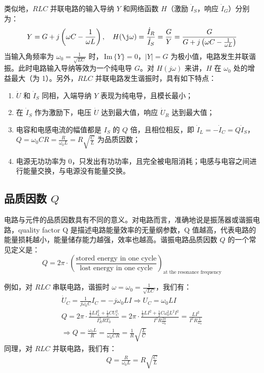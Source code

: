 \documentclass[UTF8]{report}
\def\Im{\,\mathrm{Im}\,}
\theoremstyle{MyLineTheoremStyle} %
\theoremstyle{MyBlockTheoremStyle} %
\theoremstyle{MySubsubsectionStyle} %
\begin{document}
类似地，$RLC$ 并联电路的输入导纳 $Y$ 和网络函数 $H$（激励 $\dot{I}_S$，响应 $\dot{I}_{G}$）分别为：
\begin{equation}
Y = G + j \left(\omega C - \frac{1}{\omega L}\right),\quad
H(\j\omega) = \frac{\dot{I}_R}{\dot{I}_S} = \frac{G}{Y} = \frac{G}{G + j \left(\omega C - \frac{1}{\omega L}\right)}
\end{equation}
当输入角频率为 $\omega_0 = \frac{1}{\sqrt{LC}}$ 时，$\Im \{Y\} = 0$，$|Y| = G$ 为极小值，电路发生并联谐振。此时电路输入导纳等效为一个纯电导 $G$。对 $H(j\omega)$ 来讲，$H$ 在 $\omega_0$ 处的增益最大（为 1）。另外，$RLC$ 并联电路发生谐振时，具有如下特点：
\begin{enumerate}
\item $\dot{U}$ 和 $\dot{I}_S$ 同相，入端导纳 $Y$ 表现为纯电导，且模长最小；
\item 在 $\dot{I}_S$ 作为激励下，电压 $\dot{U}$ 达到最大值，响应 $\dot{U}_R$ 达到最大值；
\item 电容和电感电流的幅值都是 $I_S$ 的 $Q$ 倍，且相位相反，即 $\dot{I}_L = -\dot{I}_C = Q \dot{I}_S$，$Q = \omega_0 C R = \frac{R}{\omega_0 L} = R\sqrt{\frac{C}{L}}$ 为品质因数；
\item 电源无功功率为 0，只发出有功功率，且完全被电阻消耗；电感与电容之间进行能量交换，与电源没有能量交换。
\end{enumerate}




\subsection{品质因数 $Q$}
电路与元件的品质因数具有不同的意义。对电路而言，准确地说是振荡器或谐振电路，quality factor Q 是描述电路能量效率的无量纲参数，Q 值越高，代表电路的能量损耗越小，能量储存能力越强，效率也越高。谐振电路品质因数 $Q$ 的一个常见定义是：
\begin{equation}\label{品质因数定义}
Q = 2\pi \cdot \left(\frac{\text{stored energy in one cycle}}{\text{lost  energy in one cycle}}\right)_{\text{at the resonance frequency}}
\end{equation}

例如，对 $RLC$ 串联电路，谐振时 $\omega = \omega_0 = \frac{1}{\sqrt{LC}}$，我们有：
\begin{gather}
\dot{U}_C = \frac{1}{j \omega_0 C} I_C = - j \omega_0 L I \Longrightarrow  U_C = \omega_0 L I \\
Q = 2 \pi \cdot \frac{ \frac{1}{2}L I_L^2  + \frac{1}{2}C U_C^2}{I_R^2 R T_0} = 2 \pi \cdot \frac{\frac{1}{2}L I^2 + \frac{1}{2} C \omega_0^2 L^2 I^2  }{I^2 R \frac{2 \pi }{\omega_0}} = \frac{LI^2}{I^2R\frac{1}{\omega_0}}\\ 
\Longrightarrow Q = \frac{\omega_0 L}{R} = \frac{1}{\omega_0 CR} = \frac{1}{R}\sqrt{\frac{L}{C}}
\end{gather}
同理，对 $RLC$ 并联电路，我们有：
\begin{gather}
Q = \frac{R}{\omega_0 L} = R\sqrt{\frac{C}{L}}
\end{gather}
\end{document}
